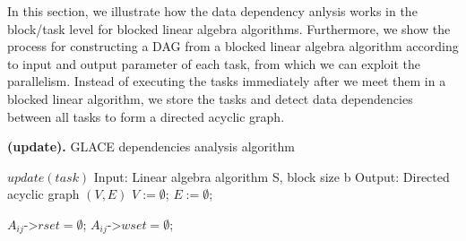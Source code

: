\documentclass[preprint,11pt]{elsarticle}
\begin{document}
In this section, we illustrate how the data dependency anlysis works in the block/task level for blocked linear algebra algorithms. Furthermore, we show the process for constructing a DAG from a blocked linear algebra algorithm according to input and output parameter of each task, from which we can exploit the parallelism. Instead of executing the tasks immediately after we meet them in a blocked linear algorithm, we store the tasks and detect data dependencies between all tasks to form a directed acyclic graph.




\begin{algorithm}
\caption{{\bf (update).} GLACE dependencies analysis algorithm}
\label{alg:update}
{\footnotesize
\begin{algorithmic} [1]
\STATE $update(task)$
\STATE Input: Linear algebra algorithm S, block size b
\STATE Output: Directed acyclic graph $(V, E)$
\STATE $V :=  \emptyset$; $E := \emptyset$;

      \STATE $A_{ij} \texttt{->} rset = \emptyset$; $A_{ij} \texttt{->} wset = \emptyset$;
    \ENDFOR
  \ENDFOR
\ENDFOR


	    \ENDIF
      \ENDFOR
    \ENDIF
  \ENDFOR

	    \ENDIF
       \ENDFOR
    \ENDIF 
  \ENDFOR

\ENDFOR


\end{algorithmic}
}
\end{algorithm}
\end{document}
